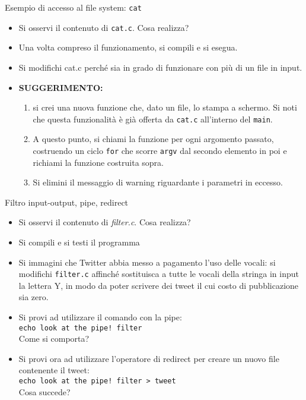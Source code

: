 \documentclass{beamer}
\begin{document}
\begin{frame}[fragile]{Esempio di accesso al file system: \texttt{cat}}
\begin{itemize}
 \item Si osservi il contenuto di \texttt{cat.c}. Cosa realizza?
 \item Una volta compreso il funzionamento, si compili e si esegua.
 \item Si modifichi cat.c perché sia in grado di funzionare con più di un file in input.
 \item \textbf{SUGGERIMENTO:}
 \begin{enumerate}
  \item si crei una nuova funzione che, dato un file, lo stampa a schermo. Si noti che questa funzionalità è già offerta da \texttt{cat.c} all'interno del \texttt{main}.
  \item A questo punto, si chiami la funzione per ogni argomento passato, costruendo un ciclo \texttt{for} che scorre \texttt{argv} dal secondo elemento in poi e richiami la funzione costruita sopra.
  \item Si elimini il messaggio di warning riguardante i parametri in eccesso.
 \end{enumerate}
\end{itemize}
\end{frame}

\begin{frame}[fragile]{Filtro input-output, pipe, redirect}
\begin{itemize}
 \item Si osservi il contenuto di \emph{filter.c}. Cosa realizza?
 \item Si compili e si testi il programma
 \item Si immagini che Twitter abbia messo a pagamento l'uso delle vocali: si modifichi \texttt{filter.c} affinché sostituisca a tutte le vocali della stringa in input la lettera Y, in modo da poter scrivere dei tweet il cui costo di pubblicazione sia zero.
 \item Si provi ad utilizzare il comando con la pipe: \\ \texttt{echo look at the pipe! \textbar{} filter} \\ Come si comporta?
 \item Si provi ora ad utilizzare l'operatore di redirect per creare un nuovo file contenente il tweet: \\ \texttt{echo look at the pipe! \textbar{} filter > tweet} \\ Cosa succede?
\end{itemize}
\end{frame}
\end{document}
